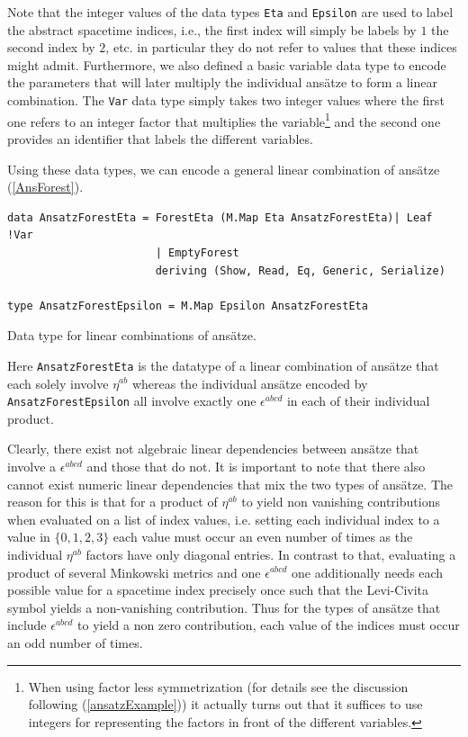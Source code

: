 \documentclass[a4paper,12pt, DIV=14, BCOR=5mm, twoside, headsepline, numbers=noenddot]{scrbook}
\begin{document}
Note that the integer values of the data types \texttt{Eta} and \texttt{Epsilon} are used to label the abstract spacetime indices, i.e., the first index will simply be labels by $1$ the second index by $2$, etc. in particular they do not refer to values that these indices might admit.
Furthermore, we also defined a basic variable data type to encode the parameters that will later multiply the individual ansätze to form a linear combination. The \texttt{Var}
data type simply takes two integer values where the first one refers to an integer factor that multiplies the variable\footnote{When using factor less symmetrization (for details see the discussion following (\ref{ansatzExample})) it actually turns out that it suffices to use integers for representing the factors in front of the different variables.} and the second one provides an identifier that labels the different variables. 

Using these data types, we can encode a general linear combination of ansätze (\ref{AnsForest}).

\begin{listing}[hbt!] 
\begin{verbatim}
data AnsatzForestEta = ForestEta (M.Map Eta AnsatzForestEta)| Leaf !Var
                       | EmptyForest 
                       deriving (Show, Read, Eq, Generic, Serialize)

type AnsatzForestEpsilon = M.Map Epsilon AnsatzForestEta
\end{verbatim} 
\caption{Data type for linear combinations of ansätze.}\label{AnsForest}
\end{listing}

Here \texttt{AnsatzForestEta} is the datatype of a linear combination of ansätze that each solely involve $\eta^{ab}$ whereas the individual ansätze encoded by \texttt{AnsatzForestEpsilon} all involve exactly one $\epsilon^{abcd}$ in each of their individual product.

Clearly, there exist not algebraic linear dependencies between ansätze that involve a $\epsilon^{abcd}$ and those that do not. 
It is important to note that there also cannot exist numeric linear dependencies that mix the two types of ansätze. The reason for this is that for a product of $\eta^{ab}$ to yield non vanishing contributions when evaluated on a list of index values, i.e. setting each individual index to a value in $\{0,1,2,3 \}$ each value must occur an even number of times as the individual $\eta^{ab}$ factors have only diagonal entries. In contrast to that, evaluating a product of several Minkowski metrics and one $\epsilon^{abcd}$ one additionally needs each possible value for a spacetime index precisely once such that the Levi-Civita symbol yields a non-vanishing contribution. Thus for the types of ansätze that include $\epsilon^{abcd}$ to yield a non zero contribution, each value of the indices must occur an odd number of times.
\end{document}
